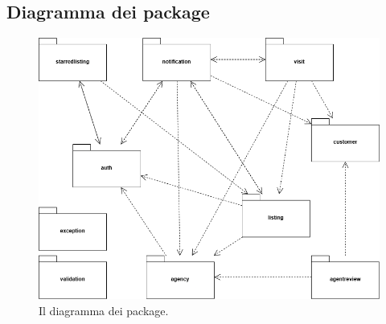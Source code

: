 \subsection{Diagramma dei package}
\begin{figure}[h]
    \centering
    \includegraphics[width=\textwidth]{assets/diagrams/class-diagram/package.png}
    \caption{Il diagramma dei package.}
    \label{fig:Diagramma dei package}
\end{figure}

